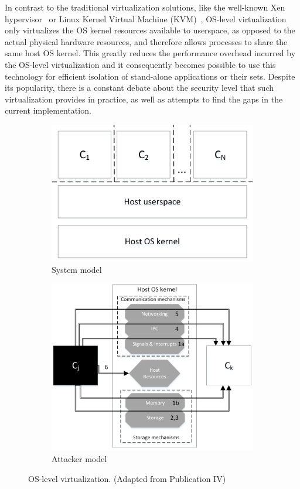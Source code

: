 In contrast to the traditional virtualization solutions, like the well-known Xen hypervisor~\cite{xenproject} or Linux Kernel Virtual Machine (KVM)~\cite{kvmproject}, OS-level virtualization only virtualizes the OS kernel resources available to userspace, as opposed to the actual physical hardware resources, and therefore allows processes to share the same host OS kernel. This greatly reduces the performance overhead incurred by the OS-level virtualization and it consequently becomes possible to use this technology for efficient isolation of stand-alone applications or their sets. Despite its popularity, there is a constant debate about the security level that such virtualization provides in practice, as well as attempts to find the gaps in the current implementation. 


\begin{figure}[t]
\centering
\begin{subfigure}{.5\textwidth}
  \centering
  \includegraphics[width=0.8\linewidth]{figures/os-virtualization-sys-model.png}
  \caption{System model}
  \label{fig:osv-1}
\end{subfigure}%
\begin{subfigure}{.5\textwidth}
  \centering
  \includegraphics[width=1\linewidth]{figures/OS-virtualization-attacker-model.png}
  \caption{Attacker model}
  \label{fig:osv-2}
\end{subfigure}
\caption{OS-level virtualization. (Adapted from Publication IV)}
\label{fig:os-virtualization}
\end{figure}


